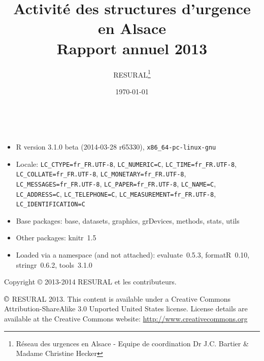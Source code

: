 \documentclass[12pt,english,french,twoside]{book}\usepackage[]{graphicx}\usepackage[]{color}
\begin{document}


\frontmatter

\title{Activité des structures d'urgence en Alsace \\Rapport annuel 2013}
\author{RESURAL\thanks{Réseau des urgences en Alsace - Equipe de coordination Dr J.C.
Bartier \& Madame Christine Hecker}}
\date{\today}
\maketitle


%

\newpage
~\vfill

\begin{itemize}\raggedright
  \item R version 3.1.0 beta (2014-03-28 r65330), \verb|x86_64-pc-linux-gnu|
  \item Locale: \verb|LC_CTYPE=fr_FR.UTF-8|, \verb|LC_NUMERIC=C|, \verb|LC_TIME=fr_FR.UTF-8|, \verb|LC_COLLATE=fr_FR.UTF-8|, \verb|LC_MONETARY=fr_FR.UTF-8|, \verb|LC_MESSAGES=fr_FR.UTF-8|, \verb|LC_PAPER=fr_FR.UTF-8|, \verb|LC_NAME=C|, \verb|LC_ADDRESS=C|, \verb|LC_TELEPHONE=C|, \verb|LC_MEASUREMENT=fr_FR.UTF-8|, \verb|LC_IDENTIFICATION=C|
  \item Base packages: base, datasets, graphics, grDevices,
    methods, stats, utils
  \item Other packages: knitr~1.5
  \item Loaded via a namespace (and not attached): evaluate~0.5.3,
    formatR~0.10, stringr~0.6.2, tools~3.1.0
\end{itemize}



Copyright \copyright{} 2013-2014 RESURAL et les contributeurs.

\noindent $\copyright$ RESURAL 2013. This content is available under a Creative Commons Attribution-ShareAlike 3.0 Unported United States license. License details are available at the Creative Commons website: \url{http://www.creativecommons.org} \\
\end{document}
